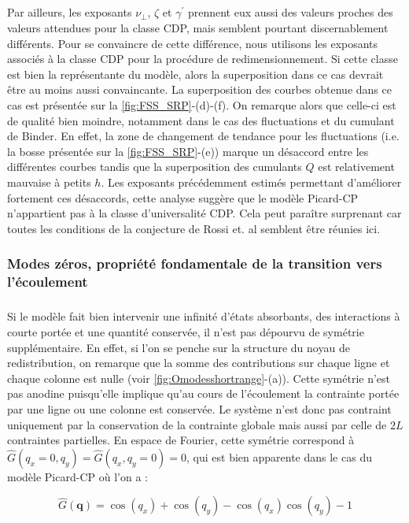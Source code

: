 \subparagraph{}Par ailleurs, les exposants $\nu_\perp$, $\zeta$ et $\gamma^\prime$ prennent eux aussi des valeurs proches des valeurs attendues pour la classe CDP, mais semblent pourtant discernablement différents. Pour se convaincre de cette différence, nous utilisons les exposants associés à la classe CDP pour la procédure de redimensionnement. Si cette classe est bien la représentante du modèle, alors la superposition dans ce cas devrait être au moins aussi convaincante. La superposition des courbes obtenue dans ce cas est présentée sur la \autoref{fig:FSS_SRP}-(d)-(f). On remarque alors que celle-ci est de qualité bien moindre, notamment dans le cas des fluctuations et du cumulant de Binder. En effet, la zone de changement de tendance pour les fluctuations (i.e. la bosse présentée sur la \autoref{fig:FSS_SRP}-(e)) marque un désaccord entre les différentes courbes tandis que la superposition des cumulants $Q$ est relativement mauvaise à petits $h$. Les exposants précédemment estimés permettant d'améliorer fortement ces désaccords, cette analyse suggère que le modèle Picard-CP n'appartient pas à la classe d'universalité CDP. Cela peut paraître surprenant car toutes les conditions de la conjecture de Rossi et. al \cite{rossi_universality_2000} semblent être réunies ici.

\subsubsection{Modes zéros, propriété fondamentale de la transition vers l'écoulement}

\subparagraph{}Si le modèle fait bien intervenir une infinité d'états absorbants, des interactions à courte portée et une quantité conservée, il n'est pas dépourvu de symétrie supplémentaire. En effet, si l'on se penche sur la structure du noyau de redistribution, on remarque que la somme des contributions sur chaque ligne et chaque colonne est nulle (voir \autoref{fig:Omodesshortrange}-(a)). Cette symétrie n'est pas anodine puisqu'elle implique qu'au cours de l'écoulement la contrainte portée par une ligne ou une colonne est conservée. Le système n'est donc pas contraint uniquement par la conservation de la contrainte globale mais aussi par celle de $2L$ contraintes partielles. En espace de Fourier, cette symétrie correspond à $\hat{G}(q_x=0,q_y)=\hat{G}(q_x,q_y=0)=0$, qui est bien apparente dans le cas du modèle Picard-CP où l'on a :

\begin{equation}
	\hat{G}(\mathbf{q}) = \cos(q_x) + \cos(q_y) -\cos(q_x)\cos(q_y) -1
	\label{eq:PicardCP}
\end{equation}

